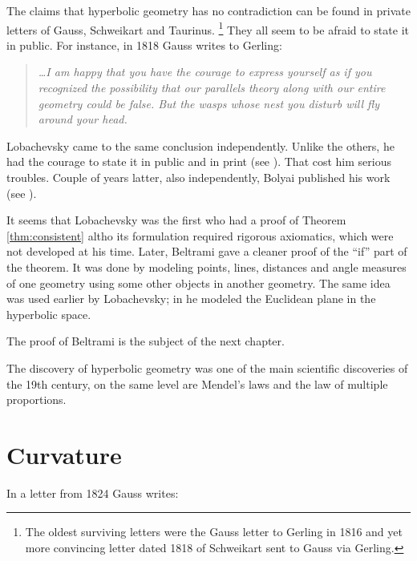 The claims
that hyperbolic geometry has no contradiction can be found in private letters of
Gauss, 
Schweikart 
and Taurinus.%
\footnote{The oldest surviving letters were the Gauss letter to Gerling in 1816 
and yet more convincing letter dated 1818 
of Schweikart sent to Gauss via Gerling.}
They all seem to be afraid to state it in public.
For instance, in 1818 Gauss writes to Gerling:

\smallskip

\begin{quotation}{\it
\dots I am happy that you have the courage to express yourself as if you recognized the possibility
that our parallels theory along with our entire geometry could be false. But the wasps whose
nest you disturb will fly around your head.}
\end{quotation}

\smallskip

Lobachevsky came to the same conclusion independently.
Unlike the others, he had the courage to state it in public and in print (see \cite{lobachevsky}).
That cost him serious troubles.
Couple of years latter, also independently, Bolyai published his work (see \cite{bolyai}).

It seems that Lobachevsky was the first who had a proof of Theorem \ref{thm:consistent} altho its formulation required rigorous axiomatics, which were not developed at his time.
Later, Beltrami gave a cleaner proof of the ``if'' part of the theorem.
It was done by modeling points, lines, distances and angle measures of one geometry using some other objects in another geometry.
The same idea was used earlier by Lobachevsky; 
in \cite[34]{lobachevsky-1840} he modeled the Euclidean plane in the hyperbolic space.

The proof of Beltrami is the subject of the next chapter. 

\medskip

The discovery of hyperbolic geometry was one of the main scientific discoveries of the 19th century, on the same level are Mendel's laws and the law of multiple proportions.

\section*{Curvature}
In a letter from 1824 Gauss writes: 

